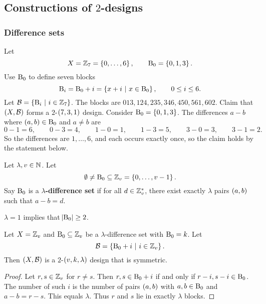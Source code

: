 \subsection{Constructions of \texorpdfstring{$ 2 $}{2}-designs}

\subsubsection{Difference sets}

\begin{example*}
Let
$$ X = \ZZ_7 = \cbr{0, \dots, 6}, \qquad \B_0 = \cbr{0, 1, 3}. $$
Use $ \mathrm{B}_0 $ to define seven blocks
$$ \B_i = \B_0 + i = \cbr{x + i \st x \in \B_0}, \qquad 0 \le i \le 6. $$
Let $ \BBB = \cbr{\B_i \st i \in \ZZ_7} $. The blocks are $ 013, 124, 235, 346, 450, 561, 602 $. Claim that $ \br{X, \BBB} $ forms a $ 2 $-$ \br{7, 3, 1} $ design. Consider $ \B_0 = \cbr{0, 1, 3} $. The differences $ a - b $ where $ \br{a, b} \in \B_0 $ and $ a \ne b $ are
$$ 0 - 1 = 6, \qquad 0 - 3 = 4, \qquad 1 - 0 = 1, \qquad 1 - 3 = 5, \qquad 3 - 0 = 3, \qquad 3 - 1 = 2. $$
So the differences are $ 1, \dots, 6 $, and each occurs exactly once, so the claim holds by the statement below.
\end{example*}

\begin{definition*}
Let $ \lambda, v \in \mathbb{N} $. Let
$$ \emptyset \ne \B_0 \subseteq \ZZ_v = \cbr{0, \dots, v - 1}. $$
Say $ \mathrm{B}_0 $ is a \textbf{$ \lambda $-difference set} if for all $ d \in \mathbb{Z}_v^* $, there exist exactly $ \lambda $ pairs $ \br{a, b} $ such that $ a - b = d $.
\end{definition*}

$ \lambda = 1 $ implies that $ \abs{\mathrm{B}_0} \ge 2 $.

\begin{proposition}
Let $ X = \mathbb{Z}_v $ and $ \mathrm{B}_0 \subseteq \mathbb{Z}_v $ be a $ \lambda $-difference set with $ \mathrm{B}_0 = k $. Let
$$ \BBB = \cbr{\B_0 + i \st i \in \ZZ_v}. $$
Then $ \br{X, \BBB} $ is a $ 2 $-$ \br{v, k, \lambda} $ design that is symmetric.
\end{proposition}

\begin{proof}
Let $ r, s \in \mathbb{Z}_v $ for $ r \ne s $. Then $ r, s \in \mathrm{B}_0 + i $ if and only if $ r - i, s - i \in \mathrm{B}_0 $. The number of such $ i $ is the number of pairs $ \br{a, b} $ with $ a, b \in \mathrm{B}_0 $ and $ a - b = r - s $. This equals $ \lambda $. Thus $ r $ and $ s $ lie in exactly $ \lambda $ blocks.
\end{proof}


